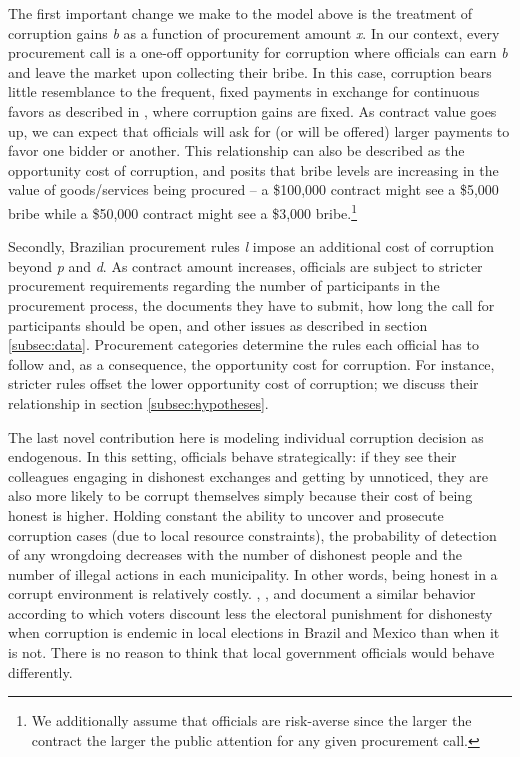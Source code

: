 \documentclass[11pt]{article}
\begin{document}
The first important change we make to the model above is the treatment of corruption gains \emph{b} as a function of procurement amount \emph{x}. In our context, every procurement call is a one-off opportunity for corruption where officials can earn \emph{b} and leave the market upon collecting their bribe. In this case, corruption bears little resemblance to the frequent, fixed payments in exchange for continuous favors as described in \citet{OlkenCorruptionDevelopingCountries2012b}, where corruption gains are fixed. As contract value goes up, we can expect that officials will ask for (or will be offered) larger payments to favor one bidder or another. This relationship can also be described as the opportunity cost of corruption, and posits that bribe levels are increasing in the value of goods/services being procured -- a \$100,000 contract might see a \$5,000 bribe while a \$50,000 contract might see a \$3,000 bribe.\footnote{We additionally assume that officials are risk-averse since the larger the contract the larger the public attention for any given procurement call.}

Secondly, Brazilian procurement rules \emph{l} impose an additional cost of corruption beyond \emph{p} and \emph{d}. As contract amount increases, officials are subject to stricter procurement requirements regarding the number of participants in the procurement process, the documents they have to submit, how long the call for participants should be open, and other issues as described in section \ref{subsec:data}. Procurement categories determine the rules each official has to follow and, as a consequence, the opportunity cost for corruption. For instance, stricter rules offset the lower opportunity cost of corruption; we discuss their relationship in section \ref{subsec:hypotheses}.

The last novel contribution here is modeling individual corruption decision as endogenous. In this setting, officials behave strategically: if they see their colleagues engaging in dishonest exchanges and getting by unnoticed, they are also more likely to be corrupt themselves simply because their cost of being honest is higher. Holding constant the ability to uncover and prosecute corruption cases (due to local resource constraints), the probability of detection of any wrongdoing decreases with the number of dishonest people and the number of illegal actions in each municipality. In other words, being honest in a corrupt environment is relatively costly. \citet{FerrazExposingCorruptPoliticians2008b}, \citet{WintersLackingInformationCondoning2013}, and \citet{ChongDoesCorruptionInformation2015} document a similar behavior according to which voters discount less the electoral punishment for dishonesty when corruption is endemic in local elections in Brazil and Mexico than when it is not. There is no reason to think that local government officials would behave differently.
\end{document}
